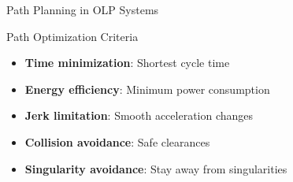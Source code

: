 \documentclass[10pt,aspectratio=169]{beamer}
\begin{document}
\begin{frame}{Path Planning in OLP Systems}
\vspace{0.5cm}
\begin{block}{Path Optimization Criteria}
\begin{itemize}
\item \textbf{Time minimization}: Shortest cycle time
\item \textbf{Energy efficiency}: Minimum power consumption
\item \textbf{Jerk limitation}: Smooth acceleration changes
\item \textbf{Collision avoidance}: Safe clearances
\item \textbf{Singularity avoidance}: Stay away from singularities
\end{itemize}
\end{block}
\end{frame}
\end{document}
